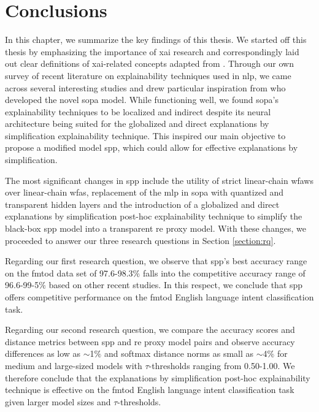\chapter{Conclusions}

\label{chapter:conclusions}

In this chapter, we summarize the key findings of this thesis. We
started off this thesis by emphasizing the importance of \ac{xai} research and
correspondingly laid out clear definitions of \ac{xai}-related concepts adapted
from \citet{arrieta2020explainable}. Through our own survey of recent literature
on explainability techniques used in \ac{nlp}, we came across several
interesting studies and drew particular inspiration from
\citet{schwartz2018sopa} who developed the novel \ac{sopa} model. While functioning
well, we found \ac{sopa}'s explainability techniques to be localized and indirect
despite its neural architecture being suited for the globalized and direct
explanations by simplification explainability technique. This inspired our main
objective to propose a modified model \ac{spp}, which could allow for
effective explanations by simplification.

The most significant changes in \ac{spp} include the utility of strict
linear-chain \ac{wfaws} over linear-chain \ac{wfas}, replacement of the \ac{mlp}
in \ac{sopa} with quantized and transparent hidden layers and the introduction of a
globalized and direct explanations by simplification post-hoc explainability
technique to simplify the black-box \ac{spp} model into a transparent \ac{re}
proxy model. With these changes, we proceeded to answer our three research
questions in Section \ref{section:rq}.

Regarding our first research question, we observe that \ac{spp}'s best accuracy
range on the \ac{fmtod} data set of 97.6-98.3$\%$ falls into the competitive accuracy
range of 96.6-99-5$\%$ based on other recent studies. In this respect, we
conclude that \ac{spp} offers competitive performance on the \ac{fmtod} English
language intent classification task.

Regarding our second research question, we compare the accuracy scores and
distance metrics between \ac{spp} and \ac{re} proxy model pairs and observe accuracy
differences as low as $\sim$1$\%$ and softmax distance norms as small as $\sim$4$\%$ for
medium and large-sized models with $\tau$-thresholds ranging from 0.50-1.00. We
therefore conclude that the explanations by simplification post-hoc
explainability technique is effective on the \ac{fmtod} English language intent
classification task given larger model sizes and $\tau$-thresholds.

